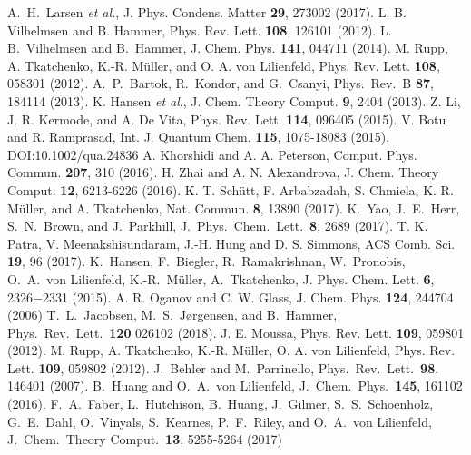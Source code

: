 \documentclass[aip,amsmath,amssymb,reprint]{revtex4-1}
\begin{document}
\begin{thebibliography}{12}
A.\ H.\ Larsen \textit{et al.}, J. Phys. Condens. Matter \textbf{29}, 273002 (2017).
L. B. Vilhelmsen and B. Hammer, Phys. Rev. Lett. \textbf{108}, 126101 (2012).
L. B.\ Vilhelmsen and B.\ Hammer, J. Chem. Phys. \textbf{141}, 044711 (2014).
 M. Rupp, A. Tkatchenko, K.-R. M\"{u}ller, and O. A. von Lilienfeld, Phys. Rev. Lett. \textbf{108}, 058301 (2012). 
 A.\ P.\ Bartok, R.\ Kondor, and G.\ Csanyi, Phys.\ Rev.\ B \textbf{87}, 184114 (2013).
K. Hansen \textit{et al}., J. Chem. Theory Comput. \textbf{9}, 2404 (2013).
Z. Li, J. R. Kermode, and A. De Vita, Phys. Rev. Lett. \textbf{114}, 096405 (2015).	
 V. Botu and R. Ramprasad, Int. J. Quantum Chem. \textbf{115}, 1075-18083 (2015). DOI:10.1002/qua.24836 
A. Khorshidi and A. A. Peterson, Comput. Phys. Commun. \textbf{207}, 310 (2016).
H. Zhai and A. N. Alexandrova, J. Chem. Theory Comput. \textbf{12}, 6213-6226 (2016).
K. T. Sch\"{u}tt, F. Arbabzadah, S. Chmiela, K. R. M\"{u}ller, and A. Tkatchenko, Nat. Commun. \textbf{8}, 13890 (2017).
K.\ Yao, J.\ E.\ Herr, S.\ N.\ Brown, and J.\ Parkhill, J.\ Phys.\ Chem.\ Lett.\ \textbf{8}, 2689 (2017).
T. K. Patra, V. Meenakshisundaram, J.-H. Hung and D. S. Simmons, ACS Comb. Sci. \textbf{19}, 96 (2017).
K.\ Hansen, F.\ Biegler, R.\ Ramakrishnan, W.\ Pronobis, O.\ A.\ von Lilienfeld, K.-R.\ M{\"u}ller, A.\ Tkatchenko, J. Phys. Chem. Lett. \textbf{6}, 2326−2331 (2015).
A. R. Oganov and C. W. Glass, J. Chem. Phys. \textbf{124}, 244704 (2006)
T.\ L.\ Jacobsen, M.\ S.\ J{\o}rgensen, and B.\ Hammer, Phys.\ Rev.\ Lett.\ \textbf{120} 026102 (2018).
 J. E. Moussa, Phys. Rev. Lett. \textbf{109}, 059801 (2012).
M. Rupp, A. Tkatchenko, K.-R. M{\"u}ller, O. A. von Lilienfeld, Phys. Rev. Lett. \textbf{109}, 059802 (2012).
J.\ Behler and M.\ Parrinello, Phys.\ Rev.\ Lett.\ \textbf{98}, 146401 (2007).
B.\ Huang and O.\ A.\ von Lilienfeld, J.\ Chem.\ Phys.\ \textbf{145}, 161102 (2016).
F.\ A.\ Faber, L.\ Hutchison, B.\ Huang, J.\ Gilmer, S.\ S.\ Schoenholz, G.\ E.\ Dahl, O.\ Vinyals, S.\ Kearnes, P.\ F.\ Riley, and O.\ A.\ von Lilienfeld, J.\ Chem.\ Theory Comput.\ \textbf{13}, 5255-5264 (2017)

\end{thebibliography}
\end{document}
